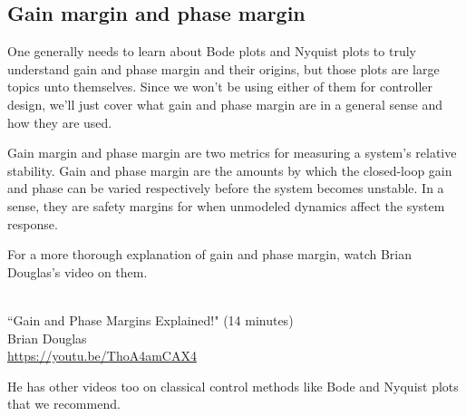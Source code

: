 \subsection{Gain margin and phase margin}
\label{subsec:gain_phase_margin}

One generally needs to learn about Bode plots and Nyquist plots to truly
understand gain and phase margin and their origins, but those plots are large
topics unto themselves. Since we won't be using either of them for controller
design, we'll just cover what gain and phase margin are in a general sense and
how they are used.

Gain margin and phase margin are two metrics for measuring a \gls{system}'s
relative stability. Gain and phase margin are the amounts by which the
closed-loop gain and phase can be varied respectively before the \gls{system}
becomes unstable. In a sense, they are safety margins for when unmodeled
dynamics affect the \gls{system response}.

For a more thorough explanation of gain and phase margin, watch Brian Douglas's
video on them.
\begin{bookfigure}
   \\
  ``Gain and Phase Margins Explained!" (14 minutes) \\
  \footnotesize Brian Douglas \\
  \url{https://youtu.be/ThoA4amCAX4}
\end{bookfigure}

He has other videos too on classical control methods like Bode and Nyquist plots
that we recommend.
